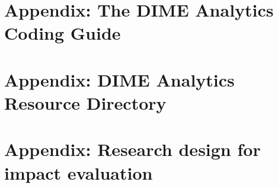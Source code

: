 


\chapter{Appendix: The DIME Analytics Coding Guide}
\label{ap:1}




\chapter{Appendix: DIME Analytics Resource Directory}
\label{ap:2}





\chapter{Appendix: Research design for impact evaluation}
\label{ap:3}




\backmatter




\printindex %



